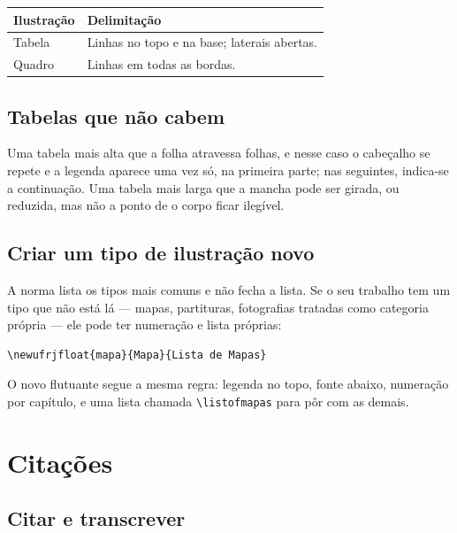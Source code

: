 \documentclass[dsc]{ufrj}
\begin{document}
  \begin{framefloat}[ht]
    \centering
    \caption{Exemplo de quadro, fechado em todas as bordas}
    \label{qua:exemplo}
    \begin{tabular}{|l|l|}
      \hline
      \textbf{Ilustração} & \textbf{Delimitação} \\
      \hline
      Tabela & Linhas no topo e na base; laterais abertas. \\
      \hline
      Quadro & Linhas em todas as bordas. \\
      \hline
    \end{tabular}
  \end{framefloat}

  \section{Tabelas que não cabem}

  Uma tabela mais alta que a folha atravessa folhas, e nesse caso o cabeçalho se
  repete e a legenda aparece uma vez só, na primeira parte; nas seguintes, indica-se
  a continuação. Uma tabela mais larga que a mancha pode ser girada, ou reduzida,
  mas não a ponto de o corpo ficar ilegível.

  \section{Criar um tipo de ilustração novo}

  A norma lista os tipos mais comuns e não fecha a lista. Se o seu trabalho tem
  um tipo que não está lá --- mapas, partituras, fotografias tratadas como
  categoria própria --- ele pode ter numeração e lista próprias:

\begin{verbatim}
\newufrjfloat{mapa}{Mapa}{Lista de Mapas}
\end{verbatim}

  O novo flutuante segue a mesma regra: legenda no topo, fonte abaixo, numeração
  por capítulo, e uma lista chamada \verb|\listofmapas| para pôr com as demais.

  \chapter{Citações}

  \section{Citar e transcrever}
\end{document}
